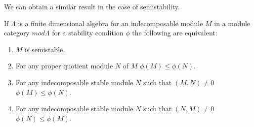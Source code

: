 \indent We can obtain a similar result in the case of semistability.\\
\begin{theorem}
If $\Lambda$ is a finite dimensional algebra for an indecomposable module $M$ in a module category $mod \Lambda$ for a stability condition $\phi$ the following are equivalent:
\begin{enumerate}
\item $M$ is semistable.
\item For any proper quotient module $N$ of $M$ $\phi(M)\leq\phi(N)$.
\item For any indecomposable stable module $N$ such that $(M,N)\neq 0$ $\phi(M)\leq\phi(N)$.
\item For any indecomposable stable module $N$ such that $(N,M)\neq 0$ $\phi(N)\leq\phi(M)$.
\end{enumerate}
\end{theorem}
